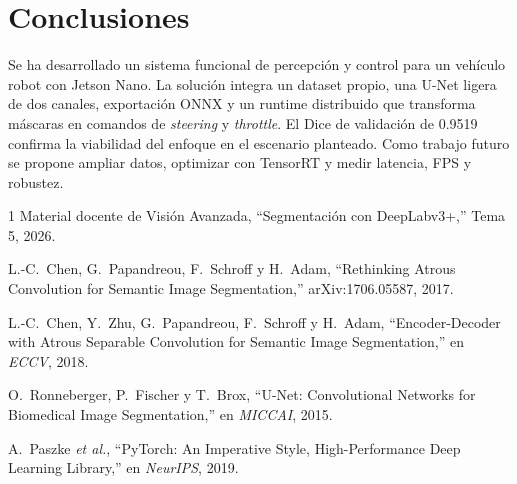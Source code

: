 \documentclass[conference,a4paper]{IEEEtran}
\begin{document}
\section{Conclusiones}
Se ha desarrollado un sistema funcional de percepci\'on y control para un veh\'iculo robot con Jetson Nano. La soluci\'on integra un dataset propio, una U-Net ligera de dos canales, exportaci\'on ONNX y un runtime distribuido que transforma m\'ascaras en comandos de \textit{steering} y \textit{throttle}. El Dice de validaci\'on de 0.9519 confirma la viabilidad del enfoque en el escenario planteado. Como trabajo futuro se propone ampliar datos, optimizar con TensorRT y medir latencia, FPS y robustez.

\begin{thebibliography}{1}
Material docente de Visi\'on Avanzada, ``Segmentaci\'on con DeepLabv3+,'' Tema 5, 2026.

L.-C.~Chen, G.~Papandreou, F.~Schroff y H.~Adam, ``Rethinking Atrous Convolution for Semantic Image Segmentation,'' arXiv:1706.05587, 2017.

L.-C.~Chen, Y.~Zhu, G.~Papandreou, F.~Schroff y H.~Adam, ``Encoder-Decoder with Atrous Separable Convolution for Semantic Image Segmentation,'' en \textit{ECCV}, 2018.

O.~Ronneberger, P.~Fischer y T.~Brox, ``U-Net: Convolutional Networks for Biomedical Image Segmentation,'' en \textit{MICCAI}, 2015.

A.~Paszke \textit{et al.}, ``PyTorch: An Imperative Style, High-Performance Deep Learning Library,'' en \textit{NeurIPS}, 2019.

\end{thebibliography}
\end{document}
